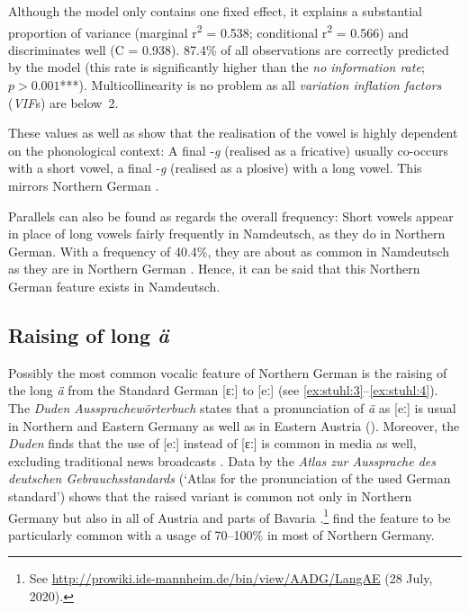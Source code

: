 \documentclass[output=paper]{langsci/langscibook}
\begin{document}
Although the model only contains one fixed effect, it explains a substantial proportion of variance (marginal r\textsuperscript{2} = 0.538; conditional r\textsuperscript{2} = 0.566) and discriminates well (C = 0.938). 87.4\% of all observations are correctly predicted by the model (this rate is significantly higher than the \textit{no information rate}; $p > 0.001$***). Multicollinearity is no problem as all \textit{variation inflation factors} (\textit{VIF}s) are below~2.\largerpage[-2]

These values as well as  show that the realisation of the vowel is highly dependent on the phonological context: A final -\textit{g} (realised as a fricative) usually co-occurs with a short vowel, a final -\textit{g} (realised as a plosive) with a long vowel. This mirrors Northern German \citep[77]{elmentaler_varietatendynamik_2008}.

Parallels can also be found as regards the overall frequency: Short vowels appear in place of long vowels fairly frequently in Namdeutsch, as they do in Northern German. With a frequency of 40.4\%, they are about as common in Namdeutsch as they are in Northern German \citep[144]{elmentaler_norddeutscher_2015}. Hence, it can be said that this Northern German feature exists in Namdeutsch.

\subsection{Raising of long \textit{ä}}
\label{sec:stuhl:4.2}

Possibly the most common vocalic feature of Northern German is the raising of the long \textit{ä} from the Standard German [ɛː] to [eː] (see \ref{ex:stuhl:3}--\ref{ex:stuhl:4}). The \textit{Duden Aussprachewörterbuch} states that a pronunciation of \textit{ä} as [eː] is usual in Northern and Eastern Germany as well as in Eastern Austria (\citealt[64]{kleiner_duden_2015}). Moreover, the \textit{Duden} finds that the use of [eː] instead of [ɛː] is common in media as well, excluding traditional news broadcasts \citep[65]{kleiner_duden_2015}. Data by the \textit{Atlas zur Aussprache des deutschen Gebrauchsstandards} (‘Atlas for the pronunciation of the used German standard’) shows that the raised variant is common not only in Northern Germany but also in all of Austria and parts of Bavaria \citep{kleiner_atlas_2011}.\footnote{See \url{http://prowiki.ids-mannheim.de/bin/view/AADG/LangAE} (28 July, 2020).} \citet[104]{elmentaler_norddeutscher_2015} find the feature to be particularly common with a usage of 70--100\% in most of Northern Germany. 
\end{document}
